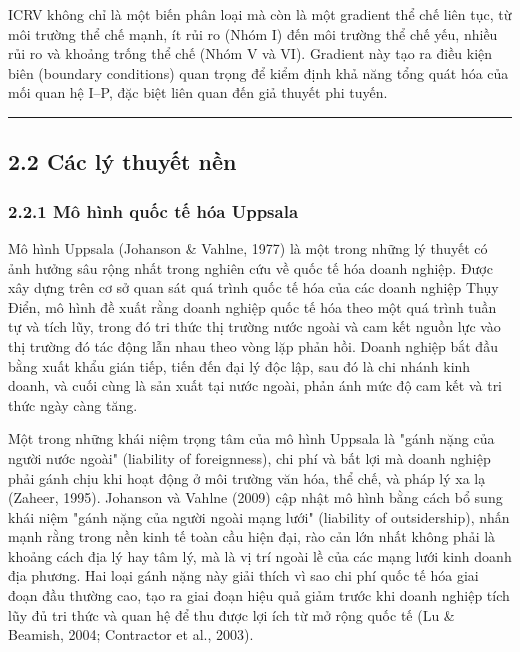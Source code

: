 \documentclass[12pt,a4paper]{article}
\begin{document}
ICRV không chỉ là một biến phân loại mà còn là một gradient thể chế liên
tục, từ môi trường thể chế mạnh, ít rủi ro (Nhóm I) đến môi trường thể
chế yếu, nhiều rủi ro và khoảng trống thể chế (Nhóm V và VI). Gradient
này tạo ra điều kiện biên (boundary conditions) quan trọng để kiểm định
khả năng tổng quát hóa của mối quan hệ I--P, đặc biệt liên quan đến giả
thuyết phi tuyến.

\begin{center}\rule{0.5\linewidth}{0.5pt}\end{center}

\hypertarget{22-cuxe1c-luxfd-thuyux1ebft-nux1ec1n}{%
\subsection{2.2 Các lý thuyết
nền}\label{22-cuxe1c-luxfd-thuyux1ebft-nux1ec1n}}

\hypertarget{221-muxf4-huxecnh-quux1ed1c-tux1ebf-huxf3a-uppsala}{%
\subsubsection{2.2.1 Mô hình quốc tế hóa
Uppsala}\label{221-muxf4-huxecnh-quux1ed1c-tux1ebf-huxf3a-uppsala}}

Mô hình Uppsala (Johanson \& Vahlne, 1977) là một trong những lý thuyết
có ảnh hưởng sâu rộng nhất trong nghiên cứu về quốc tế hóa doanh nghiệp.
Được xây dựng trên cơ sở quan sát quá trình quốc tế hóa của các doanh
nghiệp Thụy Điển, mô hình đề xuất rằng doanh nghiệp quốc tế hóa theo một
quá trình tuần tự và tích lũy, trong đó tri thức thị trường nước ngoài
và cam kết nguồn lực vào thị trường đó tác động lẫn nhau theo vòng lặp
phản hồi. Doanh nghiệp bắt đầu bằng xuất khẩu gián tiếp, tiến đến đại lý
độc lập, sau đó là chi nhánh kinh doanh, và cuối cùng là sản xuất tại
nước ngoài, phản ánh mức độ cam kết và tri thức ngày càng tăng.

Một trong những khái niệm trọng tâm của mô hình Uppsala là "gánh nặng
của người nước ngoài" (liability of foreignness), chi phí và bất lợi mà
doanh nghiệp phải gánh chịu khi hoạt động ở môi trường văn hóa, thể chế,
và pháp lý xa lạ (Zaheer, 1995). Johanson và Vahlne (2009) cập nhật mô
hình bằng cách bổ sung khái niệm "gánh nặng của người ngoài mạng lưới"
(liability of outsidership), nhấn mạnh rằng trong nền kinh tế toàn cầu
hiện đại, rào cản lớn nhất không phải là khoảng cách địa lý hay tâm lý,
mà là vị trí ngoài lề của các mạng lưới kinh doanh địa phương. Hai loại
gánh nặng này giải thích vì sao chi phí quốc tế hóa giai đoạn đầu thường
cao, tạo ra giai đoạn hiệu quả giảm trước khi doanh nghiệp tích lũy đủ
tri thức và quan hệ để thu được lợi ích từ mở rộng quốc tế (Lu \&
Beamish, 2004; Contractor et al., 2003).
\end{document}
